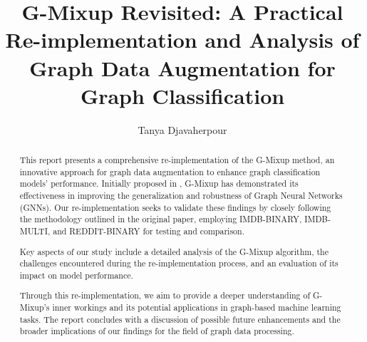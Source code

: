 \documentclass[sigconf, nonacm]{acmart}
\begin{document}
\title{G-Mixup Revisited: A Practical Re-implementation and Analysis of Graph Data Augmentation for Graph Classification}


\author{Tanya Djavaherpour}





\begin{abstract}
This report presents a comprehensive re-implementation of the G-Mixup method, an innovative approach for graph data augmentation to enhance graph classification models' performance. Initially proposed in \cite{han2022g}, G-Mixup has demonstrated its effectiveness in improving the generalization and robustness of Graph Neural Networks (GNNs). Our re-implementation seeks to validate these findings by closely following the methodology outlined in the original paper, employing IMDB-BINARY, IMDB-MULTI, and REDDIT-BINARY for testing and comparison.

Key aspects of our study include a detailed analysis of the G-Mixup algorithm, the challenges encountered during the re-implementation process, and an evaluation of its impact on model performance. 

Through this re-implementation, we aim to provide a deeper understanding of G-Mixup's inner workings and its potential applications in graph-based machine learning tasks. The report concludes with a discussion of possible future enhancements and the broader implications of our findings for the field of graph data processing.
\end{abstract}
\end{document}
